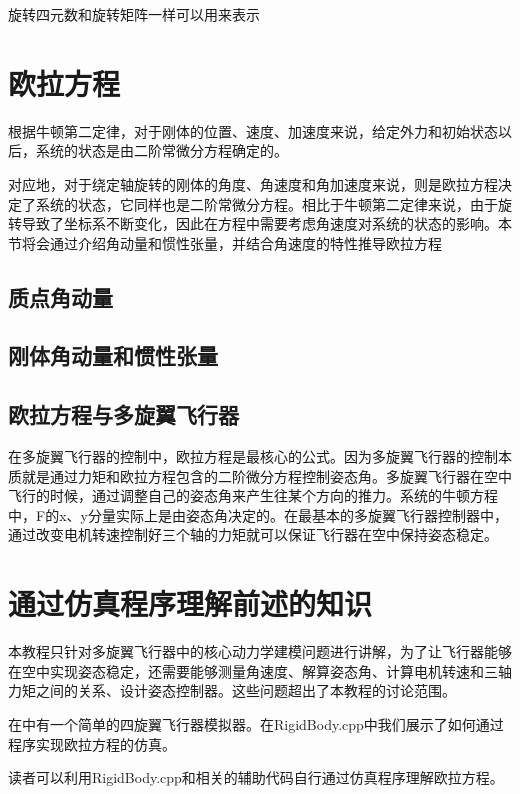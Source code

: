 \documentclass[11pt]{article}
\begin{document}
旋转四元数和旋转矩阵一样可以用来表示
\section{欧拉方程}
​根据牛顿第二定律，对于刚体的位置、速度、加速度来说，给定外力和初始状态以后，系统的状态是由二阶常微分方程确定的。

对应地，对于绕定轴旋转的刚体的角度、角速度和角加速度来说，则是欧拉方程决定了系统的状态，它同样也是二阶常微分方程。相比于牛顿第二定律来说，由于旋转导致了坐标系不断变化，因此在方程中需要考虑角速度对系统的状态的影响。本节将会通过介绍角动量和惯性张量，并结合角速度的特性推导欧拉方程
\subsection{质点角动量}
\subsection{刚体角动量和惯性张量}
\subsection{欧拉方程与多旋翼飞行器}
在多旋翼飞行器的控制中，欧拉方程是最核心的公式。因为多旋翼飞行器的控制本质就是通过力矩和欧拉方程包含的二阶微分方程控制姿态角。多旋翼飞行器在空中飞行的时候，通过调整自己的姿态角来产生往某个方向的推力。系统的牛顿方程中，F的x、y分量实际上是由姿态角决定的。在最基本的多旋翼飞行器控制器中，通过改变电机转速控制好三个轴的力矩就可以保证飞行器在空中保持姿态稳定。
\section{通过仿真程序理解前述的知识}
本教程只针对多旋翼飞行器中的核心动力学建模问题进行讲解，为了让飞行器能够在空中实现姿态稳定，还需要能够测量角速度、解算姿态角、计算电机转速和三轴力矩之间的关系、设计姿态控制器。这些问题超出了本教程的讨论范围。

在中有一个简单的四旋翼飞行器模拟器。在RigidBody.cpp中我们展示了如何通过程序实现欧拉方程的仿真。

读者可以利用RigidBody.cpp和相关的辅助代码自行通过仿真程序理解欧拉方程。
\end{document}
